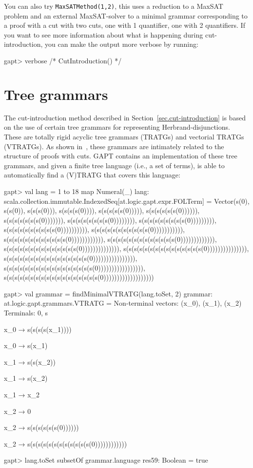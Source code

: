 \documentclass[a4paper,11pt]{book}
\begin{document}
You can also try \texttt{MaxSATMethod(1,2)}, this uses a reduction to a MaxSAT
problem and an external MaxSAT-solver to a
minimal grammar corresponding to a proof with a cut with two cuts, one with 1
quantifier, one with 2 quantifiers.  If you want to see more information
about what is happening during cut-introduction, you can make the output more
verbose by running:

\begin{clilisting}
gapt> verbose { /* CutIntroduction() */ }

\end{clilisting}

\section{Tree grammars}

The cut-introduction method described in Section~\ref{sec.cut-introduction} is
based on the use of certain tree grammars for representing Herbrand-disjunctions.
These are totally rigid acyclic tree grammars (TRATGs) and vectorial TRATGs (VTRATGs).
As shown in~\cite{Hetzl14Algorithmic}, these grammars are intimately related to
the structure of proofs with cuts.  GAPT contains an implementation of
these tree grammars, and given a finite tree language (i.e., a set of terms), is
able to automatically find a (V)TRATG that covers this language:

\begin{clilisting}
gapt> val lang = 1 to 18 map { Numeral(_) }
lang: scala.collection.immutable.IndexedSeq[at.logic.gapt.expr.FOLTerm] = Vector(s(0), s(s(0)), s(s(s(0))), s(s(s(s(0)))), s(s(s(s(s(0))))), s(s(s(s(s(s(0)))))), s(s(s(s(s(s(s(0))))))), s(s(s(s(s(s(s(s(0)))))))), s(s(s(s(s(s(s(s(s(0))))))))), s(s(s(s(s(s(s(s(s(s(0)))))))))), s(s(s(s(s(s(s(s(s(s(s(0))))))))))), s(s(s(s(s(s(s(s(s(s(s(s(0)))))))))))), s(s(s(s(s(s(s(s(s(s(s(s(s(0))))))))))))), s(s(s(s(s(s(s(s(s(s(s(s(s(s(0)))))))))))))), s(s(s(s(s(s(s(s(s(s(s(s(s(s(s(0))))))))))))))), s(s(s(s(s(s(s(s(s(s(s(s(s(s(s(s(0)))))))))))))))), s(s(s(s(s(s(s(s(s(s(s(s(s(s(s(s(s(0))))))))))))))))), s(s(s(s(s(s(s(s(s(s(s(s(s(s(s(s(s(s(0)))))))))))))))))))

gapt> val grammar = findMinimalVTRATG(lang.toSet, 2)
grammar: at.logic.gapt.grammars.VTRATG =
Non-terminal vectors: (x_0), (x_1), (x_2)
Terminals: 0, s

x_0 → s(s(s(s(x_1))))

x_0 → s(x_1)

x_1 → s(s(x_2))

x_1 → s(x_2)

x_1 → x_2

x_2 → 0

x_2 → s(s(s(s(s(s(0))))))

x_2 → s(s(s(s(s(s(s(s(s(s(s(s(0))))))))))))

gapt> lang.toSet subsetOf grammar.language
res59: Boolean = true

\end{clilisting}
\end{document}
